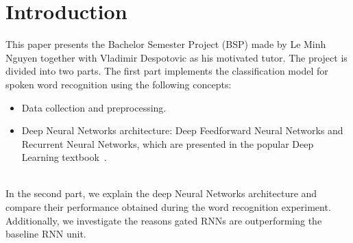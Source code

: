 
\section{Introduction}

This paper presents the Bachelor Semester Project (BSP) made by Le Minh Nguyen
together with Vladimir Despotovic as his motivated tutor. The project is divided
into two parts. The first part implements the classification model for spoken
word recognition using the following concepts:\\

\begin{itemize}
\item Data collection and preprocessing.
\item Deep Neural Networks architecture: Deep Feedforward Neural Networks and
  Recurrent Neural Networks, which are presented in the popular Deep Learning
  textbook~\cite{Goodfellow-et-al-2016}.
\end{itemize}~\\
In the second part, we explain the deep Neural Networks architecture and compare their
performance obtained during the word recognition experiment. Additionally, we
investigate the reasons gated RNNs are outperforming the baseline RNN unit.\\
